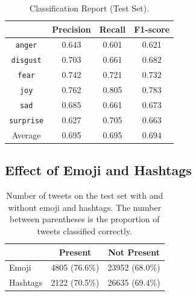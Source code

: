 \documentclass[11pt,a4paper]{article}
\begin{document}
\begin{table}[htpb]
    \centering
    \footnotesize
    
    \begin{tabular}{cccc}

        \toprule
                          & \textbf{Precision} & \textbf{Recall} & \textbf{F1-score} \\
        \midrule
        \texttt{anger}    & 0.643     & 0.601  & 0.621    \\
        \texttt{disgust}  & 0.703     & 0.661  & 0.682    \\
        \texttt{fear}     & 0.742     & 0.721  & 0.732    \\
        \texttt{joy}      & 0.762     & 0.805  & 0.783    \\
        \texttt{sad}      & 0.685     & 0.661  & 0.673    \\
        \texttt{surprise} & 0.627     & 0.705  & 0.663    \\
        \midrule
        Average           & 0.695     & 0.695  & 0.694    \\
        \bottomrule
    \end{tabular}

    \caption{Classification Report (Test Set).}

\label{table:classification_report}
\end{table}


\subsection{Effect of Emoji and Hashtags}%
\label{sub:effect_of_emoji_and_hashtags}

\begin{table}[!h]
    \centering
    \footnotesize

    \begin{tabular}{lcc}

        \toprule
        \textbf{} & \textbf{Present} & \textbf{Not Present} \\
        \midrule
        Emoji     & 4805 (76.6\%)    & 23952 (68.0\%)       \\
        Hashtags  & 2122 (70.5\%)    & 26635 (69.4\%)       \\
        \bottomrule

    \end{tabular}

    \caption{Number of tweets on the test set with and without emoji and
    hashtags. The number between parentheses is the proportion of tweets
    classified correctly.}

    \label{table:emoji_and_hashtags}

\end{table}
\end{document}
